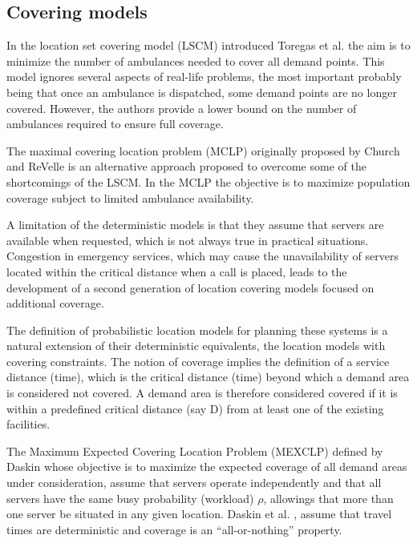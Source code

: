 \subsection{Covering models}
In the location set covering model (LSCM)
introduced Toregas et al. \cite{toregas1971location}
the aim
is to minimize
the number of ambulances needed
to cover all demand points.
This model
ignores several aspects of real-life problems,
the most important
probably being that
once an ambulance is dispatched,
some demand points
are no longer covered.
However,
the authors provide
a lower bound
on the number of ambulances
required to ensure full coverage.

The maximal covering location problem (MCLP)
originally proposed by Church and ReVelle \cite{church1974maximal}
is an alternative approach
proposed to overcome some of the shortcomings of the LSCM.
In the MCLP the objective is to maximize population coverage
subject to limited ambulance availability.

A limitation of the deterministic models
is that
they assume
that servers are available when requested,
which is not always true in practical situations.
Congestion in emergency services,
which may cause
the unavailability of servers located
within the critical distance
when a call is placed,
leads to
the development of
a second generation of location covering models
focused on additional coverage.

The definition of
probabilistic location models for planning these systems
is a natural extension
of their deterministic equivalents,
the location models with covering constraints.
The notion of coverage
implies
the definition of a service distance (time),
which is the critical distance (time)
beyond which a demand area is considered not covered.
A demand area is
therefore
considered covered
if
it is within a predefined critical distance (say D)
from at least one of the existing facilities.

The Maximum Expected Covering Location Problem (MEXCLP)
defined by Daskin \cite{daskin1983maximum}
whose objective is to
maximize the expected coverage
of all demand areas under consideration,
assume that servers operate independently
and that all servers have the same busy probability (workload) $\rho$,
allowings that more than one server be situated in any given location.
Daskin et al. \cite{daskin1981hierarchical},
assume
that travel times are deterministic
and coverage is an ``all-or-nothing'' property.

